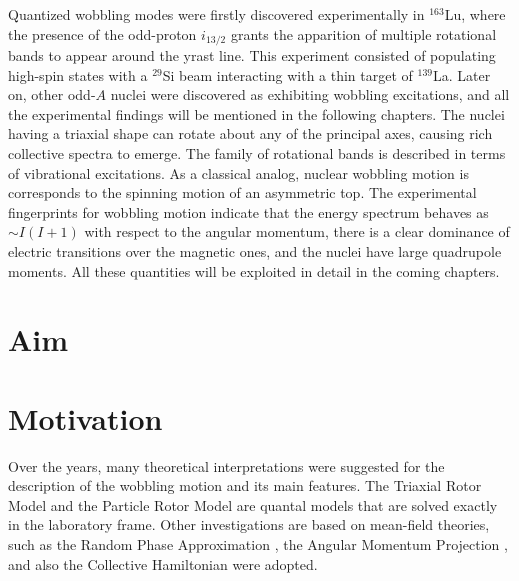 Quantized wobbling modes were firstly discovered experimentally in $^{163}$Lu, where the presence of the odd-proton $i_{13/2}$ grants the apparition of multiple rotational bands to appear around the yrast line. This experiment consisted of populating high-spin states with a $^{29}$Si beam interacting with a thin target of $^{139}$La. Later on, other odd-$A$ nuclei were discovered as exhibiting wobbling excitations, and all the experimental findings will be mentioned in the following chapters. The nuclei having a triaxial shape can rotate about any of the principal axes, causing rich collective spectra to emerge. The family of rotational bands is described in terms of vibrational excitations. As a classical analog, nuclear wobbling motion is corresponds to the spinning motion of an asymmetric top. The experimental fingerprints for wobbling motion indicate that the energy spectrum behaves as $\sim I(I+1)$ with respect to the angular momentum, there is a clear dominance of electric transitions over the magnetic ones, and the nuclei have large quadrupole moments. All these quantities will be exploited in detail in the coming chapters.

\section{Aim}
 


\section{Motivation}

Over the years, many theoretical interpretations were suggested for the description of the wobbling motion and its main features. The Triaxial Rotor Model \cite{bohr1998nuclear,davydov1958rotational} and the Particle Rotor Model \cite{hamamoto2002wobbling} are quantal models that are solved exactly in the laboratory frame. Other investigations are based on mean-field theories, such as the Random Phase Approximation \cite{shimizu1995nuclear}, the Angular Momentum Projection \cite{oi2000wobbling}, and also the Collective Hamiltonian \cite{chen2014collective} were adopted.
